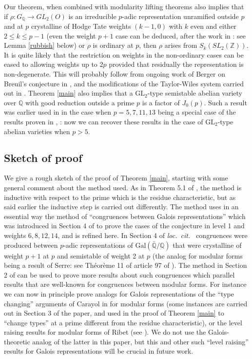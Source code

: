 \documentclass[12pt]{amsart}
\newcommand{\Q}{\mathbb{Q}}
\newcommand{\Z}{\mathbb{Z}}
\newcommand{\GL}{\mathrm{GL}}
\newcommand{\Galois}{\mathrm{Gal}}
\newcommand{\Gal}{\Galois( \bar{ {\mathbb Q}}/{\mathbb Q})}
\begin{document}
Our theorem, when combined with modularity lifting theorems also implies that if $\rho:G_\Q \rightarrow GL_2({O})$ is an irreducible $p$-adic representation unramified outside $p$ and at $p$ crystalline of Hodge Tate weights $(k-1,0)$ with $k$ even and 
either $2 \leq k \leq p-1$ (even the weight $p+1$ case can be deduced, after the work in \cite{BLZ}: 
see Lemma \ref{rubbish} below) or $\rho$ is ordinary at $p$, then $\rho$ arises from $S_k(SL_2(\Z))$. It is quite likely that the restriction on weights in the non-ordinary cases
can be eased to allowing weights up to $2p$ provided that residually the representation is non-degenerate. This will probably follow
from ongoing work of Berger on Breuil's conjecture in \cite{Breuill}, and the modifications of the Taylor-Wiles system carried out in \cite{Kisin}.
Theorem \ref{main} also implies that
a $\GL_2$-type semistable abelian variety over $\Q$ with good reduction outside a prime $p$ is a factor of $J_0(p)$. Such a result was earlier used in \cite{KW} in the case when $p=5,7,11,13$ being a special case of the results proven in \cite{Schoof1}, \cite{BK}: now we can recover these results in the case of $\GL_2$-type abelian varieties when $p>5$. 

\subsection{Sketch of proof}

We give a 
rough sketch of the proof of Theorem \ref{main}, starting with some general comment about the method used. As in Theorem 5.1 of \cite{KW}, the method is inductive with respect to the prime which is the residue characteristic, but as said earlier the inductive step is carried out differently. The method uses in an essential way the method of 
``congruences between Galois representations'' which was introduced in Section 4 of \cite{KW}
to prove the cases of the conjecture in level 1 and weights $6,8,12,14$, and is refined here. In Section 4 of {\em loc.\ cit.\ }   congruences were produced
between $p$-adic representations of $\Gal$ 
that were crystalline of weight $p+1$ at $p$ and semistable of weight 2 at $p$
(the analog for modular forms being a result of Serre: see Th\'eor\`eme 11 of 
article 97 of \cite{Serre2}).
The  method in Section 2 of \cite{KW} can be used to prove more results about such congruences which parallel 
results that are well-known for congruences between modular forms. For instance
we can now in principle prove analogs for Galois representations of 
the ``type changing'' arguments of Carayol in \cite{car} for modular forms (some instances are carried out in 
Section 3 of the paper, and used in the proof of Theorem \ref{main} to ``change types'' at a prime different from the residue characteristic), or the level raising results for
modular forms of Ribet (see  \cite{Ribet1}). We do not use the Galois-theoretic
analog of the latter in this paper, but this and other such ``level raising'' results for Galois representations will be crucial in future work. 
\end{document}
